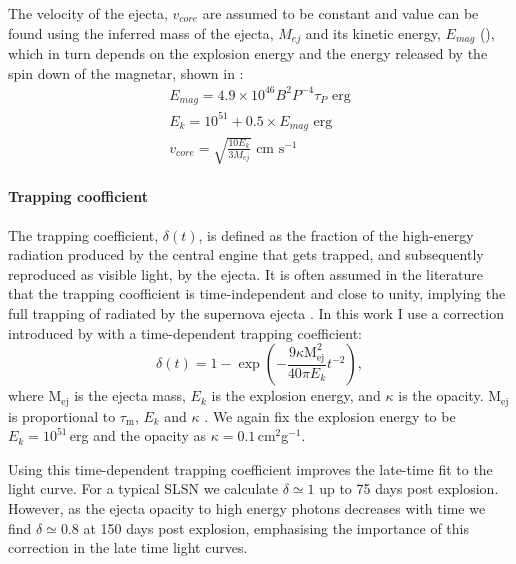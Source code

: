 The velocity of the ejecta, $v_{core}$ are assumed to be constant and value can be found using the inferred mass of the ejecta, $M_{ej}$ and its kinetic energy, $E_{mag}$ (), which in turn depends on the explosion energy and the energy released by the spin down of the magnetar, shown in :
\begin{align}
\label{Eq:Emag}
E_{mag} = 4.9\times10^{46} B^2 P^{-4} \tau_{P}  \text{ erg} \\
E_k = 10^{51} + 0.5 \times E_{mag} \text{ erg}\\
\label{Eq:vcore}
v_{core} =  \sqrt{\frac{10 E_{k}}{3 M_{ej}}} \text{ cm s}^{-1}
\end{align}

\paragraph{Trapping coofficient}
The trapping coefficient, $\delta(t)$, is defined as the fraction of the high-energy radiation produced by the central engine that gets trapped, and subsequently reproduced as visible light, by the ejecta. It is often assumed in the literature that the trapping coofficient is time-independent and close to unity, implying the full trapping of radiated by the supernova ejecta \citep{Inserra2013,Papadopuplus2014,Nicoll2015}. In this work I use a correction introduced by \cite{Wang2015} with a time-dependent trapping coefficient:
\begin{equation}
\delta(t) = 1 - \exp\left({-\frac{9\kappa \mathrm{M}_{\mathrm{ej}}^{2}}{40\pi  E_k} t^{-2}} \right),
\label{Eq:Wang}
\end{equation}
\noindent where $\mathrm{M}_{\mathrm{ej}}$ is the ejecta mass, $E_k$ is the explosion energy, and $\kappa$ is the opacity. $\mathrm{M}_{\mathrm{ej}}$ is proportional to $\tau_\mathrm{m}$, $E_k$ and $\kappa$ \citep{Inserra2013}. We again fix the explosion energy to be $E_k = 10^{51}$\,erg and the opacity as $\kappa = 0.1$\,cm$^2$g$^{-1}$.

Using this time-dependent trapping coefficient improves the late-time fit to the light curve. For a typical SLSN we calculate $\delta \simeq 1$ up to 75 days post explosion. However, as the ejecta opacity to high energy photons decreases with time we find $\delta \simeq 0.8$ at 150 days post explosion, emphasising the importance of this correction in the late time light curves.

